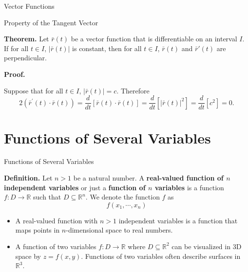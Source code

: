 \documentclass{beamer}
\begin{document}
    \begin{frame}[t]{Vector Functions}
        \begin{block}{Property of the Tangent Vector}
            \par \textbf{Theorem.} Let $\bar{r} (t)$ be a vector function that is differentiable on an interval $I$. If for all $t \in I$, $|\bar{r} (t) |$ is constant, then for all $t \in I$, $\bar{r}(t)$ and $\bar{r}'(t)$ are perpendicular. 
        \end{block}

        \phantom{zjy}

        \par \textbf{Proof.} 
        \par Suppose that for all $t \in I$, $|\bar{r} (t)| = c$. Therefore 
        \begin{equation*}
            2\left(\bar{r}^{\prime}(t) \cdot \bar{r}(t)\right)=\frac{d}{d t}[\bar{r}(t) \cdot \bar{r}(t)]=\frac{d}{d t}\left[|\bar{r}(t)|^{2}\right]=\frac{d}{d t}\left[c^{2}\right]=0 .
        \end{equation*}
    \end{frame}


\section{Functions of Several Variables}
    \begin{frame}[label=5]{Functions of Several Variables}
        \begin{block}
            \par \textbf{Definition.} Let $n > 1$ be a natural number. A \textbf{real-valued function of $n$ independent variables} or just a \textbf{function of $n$ variables} is a function $f: D \to \mathbb{R}$ such that $D \subseteq \mathbb{R}^n$. We denote the function $f$ as 
            \begin{equation*}
                f(x_1, \cdots, x_n)
            \end{equation*}
        \end{block}
        

        
        \begin{itemize}
            \item  A real-valued function with $n > 1$ independent variables is a function that maps points in $n$-dimensional space to real numbers.
            \item  A function of two variables $f: D \to \mathbb{R}$ where $D \subseteq \mathbb{R}^2$ can be visualized in 3D space by $z = f(x,y)$. Functions of two variables often describe surfaces in $\mathbb{R}^3$.
        \end{itemize}
    \end{frame}
\end{document}
